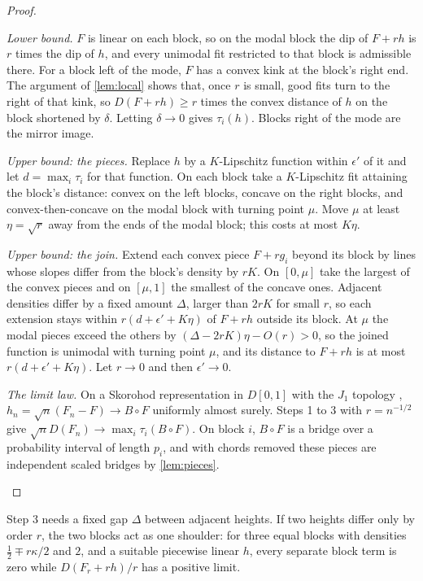 \begin{proof}
\begin{steps}
\item \emph{Lower bound.} $F$ is linear on each block, so on the modal block the dip of $F+rh$ is $r$ times the dip of $h$, and every unimodal fit restricted to that block is admissible there. For a block left of the mode, $F$ has a convex kink at the block's right end. The argument of \cref{lem:local} shows that, once $r$ is small, good fits turn to the right of that kink, so $D(F+rh)\ge r$ times the convex distance of $h$ on the block shortened by $\delta$. Letting $\delta\to0$ gives $\tau_i(h)$. Blocks right of the mode are the mirror image.
\item \emph{Upper bound: the pieces.} Replace $h$ by a $K$-Lipschitz function within $\epsilon'$ of it and let $d=\max_i\tau_i$ for that function. On each block take a $K$-Lipschitz fit attaining the block's distance: convex on the left blocks, concave on the right blocks, and convex-then-concave on the modal block with turning point $\mu$. Move $\mu$ at least $\eta=\sqrt r$ away from the ends of the modal block; this costs at most $K\eta$.
\item \emph{Upper bound: the join.} Extend each convex piece $F+rg_i$ beyond its block by lines whose slopes differ from the block's density by $rK$. On $[0,\mu]$ take the largest of the convex pieces and on $[\mu,1]$ the smallest of the concave ones. Adjacent densities differ by a fixed amount $\Delta$, larger than $2rK$ for small $r$, so each extension stays within $r(d+\epsilon'+K\eta)$ of $F+rh$ outside its block. At $\mu$ the modal pieces exceed the others by $(\Delta-2rK)\eta-O(r)>0$, so the joined function is unimodal with turning point $\mu$, and its distance to $F+rh$ is at most $r(d+\epsilon'+K\eta)$. Let $r\to0$ and then $\epsilon'\to0$.
\item \emph{The limit law.} On a Skorohod representation in $D[0,1]$ with the $J_1$ topology \cite{Billingsley99}, $h_n=\sqrt n(F_n-F)\to B\circ F$ uniformly almost surely. Steps 1 to 3 with $r=n^{-1/2}$ give $\sqrt nD(F_n)\to\max_i\tau_i(B\circ F)$. On block $i$, $B\circ F$ is a bridge over a probability interval of length $p_i$, and with chords removed these pieces are independent scaled bridges by \cref{lem:pieces}.\qedhere
\end{steps}
\end{proof}

Step 3 needs a fixed gap $\Delta$ between adjacent heights. If two heights differ only by order $r$, the two blocks act as one shoulder: for three equal blocks with densities $\frac12\mp r\kappa/2$ and $2$, and a suitable piecewise linear $h$, every separate block term is zero while $D(F_r+rh)/r$ has a positive limit.

